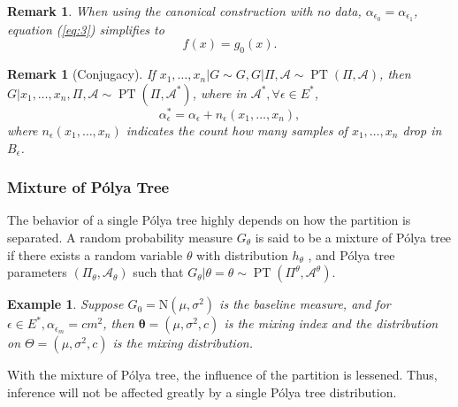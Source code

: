 \documentclass[12pt]{article}
\newtheorem{rmk}[thm]{Remark}
\newtheorem{emp}[thm]{Example}
\newcommand{\polya}{P\'{o}lya}
\DeclareMathOperator{\pt}{PT}
\begin{document}
\begin{rmk}
  When using the canonical construction with no data,
  $\alpha_{\epsilon_0 } = \alpha_{\epsilon_1}$, equation (\ref{eq:3})
  simplifies to 
  \begin{displaymath}
    f(x) = g_0(x).
  \end{displaymath}
\end{rmk}

\begin{rmk}[Conjugacy]
  If $x_1, \ldots, x_n | G \sim G, G|\Pi, \mathcal{A} \sim \pt (\Pi,
  \mathcal{A})$, then $G|x_1, \ldots, x_n , \Pi, \mathcal{A} \sim \pt
  (\Pi, \mathcal{A}^{*})$, where in $\mathcal{A}^{*}, \forall \epsilon
  \in E^{*}$, 
  \begin{displaymath}
    \alpha_{\epsilon}^{*} = \alpha_{\epsilon} + n_{\epsilon}(x_1, \ldots, x_n),
  \end{displaymath}
  where $n_{\epsilon}(x_1, \ldots, x_n)$ indicates the count how many
  samples of $x_1, \ldots, x_n$ drop in $B_{\epsilon}$. 
\end{rmk}

\subsubsection{Mixture of \polya{} Tree}
The behavior of a single \polya{} tree highly depends on how the
partition is separated. A random probability measure $G_\theta$ is
said to be a mixture of \polya{} tree if there exists a random
variable $\theta$ with distribution $h_{\theta}$ , and \polya{} tree
parameters $(\Pi_{\theta}, \mathcal{A}_{\theta})$ such that
$G_{\theta} | \theta=\theta \sim \pt (\Pi^{\theta},
\mathcal{A}^{\theta})$.

\begin{emp}
  Suppose $G_0 = \mathrm{N}(\mu, \sigma^2)$ is the baseline measure, and
  for $\epsilon \in E^{*}, \alpha_{\epsilon_m} = cm^2 $, then
  $\bm{\theta}= (\mu, \sigma^2, c)$ is the mixing index and the
  distribution on $\Theta = (\mu, \sigma^2, c) $ is the mixing
  distribution. 
\end{emp}
With the mixture of \polya{} tree, the influence of the partition
is lessened. Thus, inference will not be affected greatly by a single
\polya{} tree distribution. 
\end{document}
